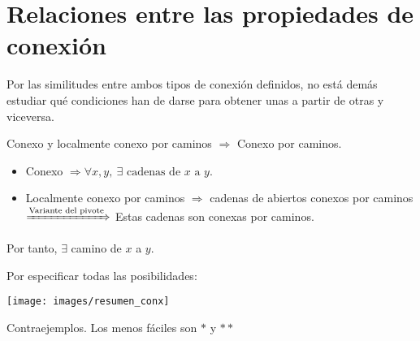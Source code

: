 \section{Relaciones entre las propiedades de conexión}%
\label{sec:relaciones_entre_las_propiedades_de_conexion}
Por las similitudes entre ambos tipos de conexión definidos, no está demás estudiar qué condiciones han de darse para obtener unas a partir de otras y viceversa.

\begin{prop}
Conexo y localmente conexo por caminos $\Rightarrow$ Conexo por caminos.
\end{prop}
\begin{demo}
\begin{itemize}
    \item Conexo $\Rightarrow \forall x, y,\ \exists \text{ cadenas de } x \text{ a } y$.
    \item Localmente conexo por caminos $\Rightarrow$ cadenas de abiertos conexos por caminos $\xRightarrow{\text{Variante del pivote}}$ Estas cadenas son conexas por caminos.
\end{itemize}
Por tanto, $\exists$ camino de $x$ a $y$.
\end{demo}

\begin{obs}[Resumen]
Por especificar todas las posibilidades:
\begin{center}
    \texttt{[image: images/resumen\_conx]} 
\end{center}
\end{obs}

\begin{enun}
Contraejemplos. Los menos fáciles son $*$ y $**$ 
\end{enun}

